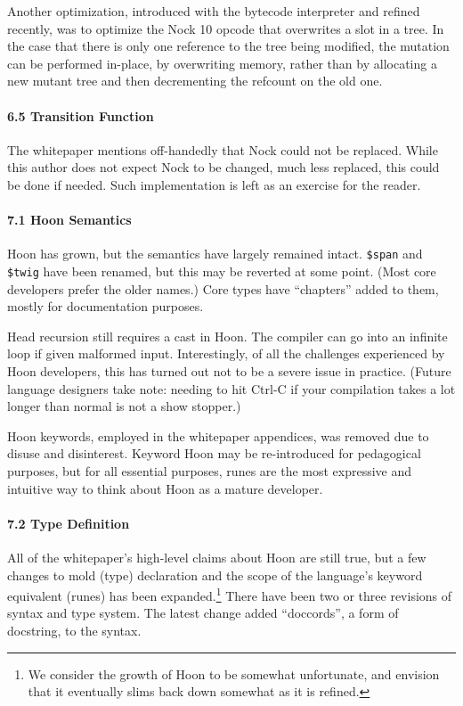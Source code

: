 \documentclass[twoside]{article}
\begin{document}
Another optimization, introduced with the bytecode interpreter and refined recently, was to optimize the Nock 10 opcode that overwrites a slot in a tree.  In the case that there is only one reference to the tree being modified, the mutation can be performed in-place, by overwriting memory, rather than by allocating a new mutant tree and then decrementing the refcount on the old one.

\paragraph{6.5 Transition Function}

The whitepaper mentions off-handedly that Nock could not be replaced.  While this author does not expect Nock to be changed, much less replaced, this could be done if needed.  Such implementation is left as an exercise for the reader.

\paragraph{7.1 Hoon Semantics}

Hoon has grown, but the semantics have largely remained intact.  \lstinline[style=inlinecode]{$span} and \lstinline[style=inlinecode]{$twig} have been renamed, but this may be reverted at some point.  (Most core developers prefer the older names.)  Core types have ``chapters'' added to them, mostly for documentation purposes.

Head recursion still requires a cast in Hoon.  The compiler can go into an infinite loop if given malformed input.  Interestingly, of all the challenges experienced by Hoon developers, this has turned out not to be a severe issue in practice.  (Future language designers take note:  needing to hit Ctrl-C if your compilation takes a lot longer than normal is not a show stopper.)

Hoon keywords, employed in the whitepaper appendices, was removed due to disuse and disinterest.  Keyword Hoon may be re-introduced for pedagogical purposes, but for all essential purposes, runes are the most expressive and intuitive way to think about Hoon as a mature developer.

\paragraph{7.2 Type Definition}

All of the whitepaper's high-level claims about Hoon are still true, but a few changes to mold (type) declaration and the scope of the language's keyword equivalent (runes) has been expanded.\footnote{We consider the growth of Hoon to be somewhat unfortunate, and envision that it eventually slims back down somewhat as it is refined.}  There have been two or three revisions of syntax and type system.  The latest change added ``doccords'', a form of docstring, to the syntax.
\end{document}
